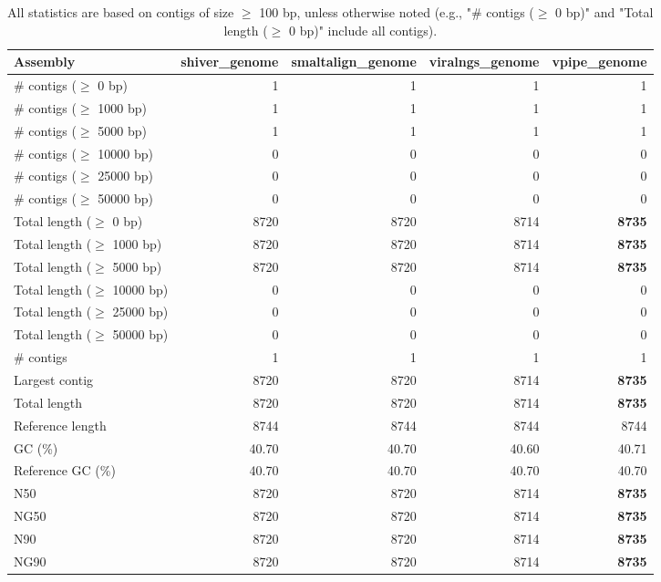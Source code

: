 \documentclass[12pt,a4paper]{article}
\begin{document}
\begin{table}[ht]
\begin{center}
\caption{All statistics are based on contigs of size $\geq$ 100 bp, unless otherwise noted (e.g., "\# contigs ($\geq$ 0 bp)" and "Total length ($\geq$ 0 bp)" include all contigs).}
\begin{tabular}{|l*{4}{|r}|}
\hline
Assembly & shiver\_genome & smaltalign\_genome & viralngs\_genome & vpipe\_genome \\ \hline
\# contigs ($\geq$ 0 bp) & 1 & 1 & 1 & 1 \\ \hline
\# contigs ($\geq$ 1000 bp) & 1 & 1 & 1 & 1 \\ \hline
\# contigs ($\geq$ 5000 bp) & 1 & 1 & 1 & 1 \\ \hline
\# contigs ($\geq$ 10000 bp) & 0 & 0 & 0 & 0 \\ \hline
\# contigs ($\geq$ 25000 bp) & 0 & 0 & 0 & 0 \\ \hline
\# contigs ($\geq$ 50000 bp) & 0 & 0 & 0 & 0 \\ \hline
Total length ($\geq$ 0 bp) & 8720 & 8720 & 8714 & {\bf 8735} \\ \hline
Total length ($\geq$ 1000 bp) & 8720 & 8720 & 8714 & {\bf 8735} \\ \hline
Total length ($\geq$ 5000 bp) & 8720 & 8720 & 8714 & {\bf 8735} \\ \hline
Total length ($\geq$ 10000 bp) & 0 & 0 & 0 & 0 \\ \hline
Total length ($\geq$ 25000 bp) & 0 & 0 & 0 & 0 \\ \hline
Total length ($\geq$ 50000 bp) & 0 & 0 & 0 & 0 \\ \hline
\# contigs & 1 & 1 & 1 & 1 \\ \hline
Largest contig & 8720 & 8720 & 8714 & {\bf 8735} \\ \hline
Total length & 8720 & 8720 & 8714 & {\bf 8735} \\ \hline
Reference length & 8744 & 8744 & 8744 & 8744 \\ \hline
GC (\%) & 40.70 & 40.70 & 40.60 & 40.71 \\ \hline
Reference GC (\%) & 40.70 & 40.70 & 40.70 & 40.70 \\ \hline
N50 & 8720 & 8720 & 8714 & {\bf 8735} \\ \hline
NG50 & 8720 & 8720 & 8714 & {\bf 8735} \\ \hline
N90 & 8720 & 8720 & 8714 & {\bf 8735} \\ \hline
NG90 & 8720 & 8720 & 8714 & {\bf 8735} \\ \hline

\end{tabular}
\end{center}
\end{table}
\end{document}
